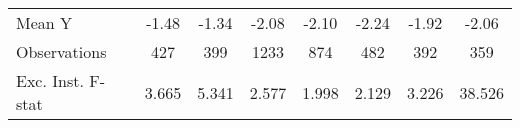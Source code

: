 {\begin{tabular}{l*{7}{c}}
\midrule
Mean Y      &       -1.48         &       -1.34         &       -2.08         &       -2.10         &       -2.24         &       -1.92         &       -2.06         \\
Observations&         427         &         399         &        1233         &         874         &         482         &         392         &         359         \\
Exc. Inst. F-stat&       3.665         &       5.341         &       2.577         &       1.998         &       2.129         &       3.226         &      38.526         \\
\bottomrule
\end{tabular}
}
